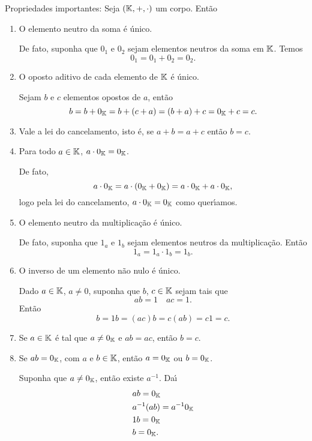 Propriedades importantes: Seja $(\mathbb{K}, +, \cdot)$ um corpo. Ent\~ao
\begin{enumerate}
	\item O elemento neutro da soma \'e \'unico.
	\begin{solucao}
		De fato, suponha que $0_1$ e $0_2$ sejam elementos neutros da soma em $\mathbb{K}$. Temos
		\[
          0_1 = 0_1 + 0_2 = 0_2.
		\]
	\end{solucao}
	\item O oposto aditivo de cada elemento de $\mathbb{K}$ \'e \'unico.
	\begin{solucao}
		Sejam $b$ e $c$ elementos opostos de $a$, ent\~ao
		\[
          b = b + 0_{\mathbb{K}} = b + (c + a) = (b + a) + c = 0_{\mathbb{K}} + c = c.
		\]
	\end{solucao}
	\item Vale a lei do cancelamento, isto \'e, se $a + b = a + c$ ent\~ao $b = c$.
	\item Para todo $a \in \mathbb{K}$, $a\cdot 0_{\mathbb{K}} = 0_{\mathbb{K}}$.
	\begin{solucao}
		De fato,
		\[
		a\cdot 0_{\mathbb{K}} = a\cdot (0_{\mathbb{K}} + 0_{\mathbb{K}}) = a\cdot 0_{\mathbb{K}} + a\cdot 0_{\mathbb{K}},
		\]
		logo pela lei do cancelamento, $a\cdot 0_{\mathbb{K}} = 0_{\mathbb{K}}$ como quer{\'\i}amos.
	\end{solucao}
	\item O elemento neutro da multiplica\c{c}\~ao \'e \'unico.
	\begin{solucao}
		De fato, suponha que $1_a$ e $1_b$ sejam elementos neutros da multiplica\c{c}\~ao. Ent\~ao
		\[
          1_a = 1_a\cdot 1_b = 1_b.
		\]
	\end{solucao}
	\item O inverso de um elemento n\~ao nulo \'e \'unico.
	\begin{solucao}
		Dado $a \in \mathbb{K}$, $a \ne 0$, suponha que $b$, $c \in \mathbb{K}$ sejam tais que
		\[
		  ab = 1 \quad ac = 1.
		\]
		Ent\~ao
		\[
		  b = 1b = (ac)b = c(ab) = c1 = c.
		\]
	\end{solucao}
	\item Se $a \in \mathbb{K}$ \'e tal que $a \ne 0_{\mathbb{K}}$ e $ab = ac$, ent\~ao $b = c$.
	\item Se $ab = 0_{\mathbb{K}}$, com $a$ e $b \in \mathbb{K}$, ent\~ao $a = 0_{\mathbb{K}}$ ou $b = 0_{\mathbb{K}}$.
	\begin{solucao}
		Suponha que $a \ne 0_{\mathbb{K}}$, ent\~ao existe $a^{-1}$. Da{\'\i}
		\begin{align*}
			&ab = 0_{\mathbb{K}}\\
			&a^{-1}(ab) = a^{-1}0_{\mathbb{K}}\\
			&1b = 0_{\mathbb{K}}\\
			&b = 0_{\mathbb{K}}.
		\end{align*}
	\end{solucao}
\end{enumerate}

